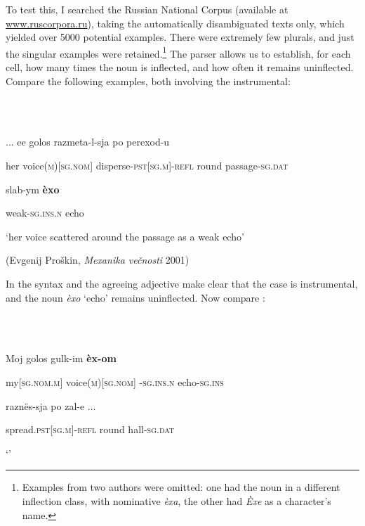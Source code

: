 \documentclass[output=paper]{langscibook}
\begin{document}
To test this, I searched the Russian National Corpus (available at \href{http://www.ruscorpora.ru}{{www.ruscorpora.ru}}), taking the automatically disambiguated texts only, which yielded over 5000 potential examples. There were extremely few plurals, and just the singular examples were retained.\footnote{\textrm{Examples from two authors were omitted: one had the noun in a different inflection class, with nominative} \textrm{\textit{èxa}}\textrm{, the other had} \textrm{\textit{Èxe}} \textrm{as a character’s name.}} The parser allows us to establish, for each cell, how many times the noun is inflected, and how often it remains uninflected. Compare the following examples, both involving the instrumental:

\ea%
    \label{ex:key:7}
    \gll \\
         \\
    \glt
    \z %

          ... ee  golos  razmeta-l-sja  po  perexod-u

      her  voice(\textsc{m)[sg.nom}]  disperse-\textsc{pst[sg.m}]\textsc{{}-refl}  round  passage-\textsc{sg.dat}

  slab-ym  \textbf{èxo}

  weak-\textsc{sg.ins.n}  echo

  ‘her voice scattered around the passage as a weak echo’ 

    (Evgenij Proškin, \textit{Mexanika večnosti} 2001)

In  the syntax and the agreeing adjective make clear that the case is instrumental, and the noun \textit{èxo} ‘echo’ remains uninflected. Now compare :

\ea%
    \label{ex:key:8}
    \gll \\
         \\
    \glt
    \z %

          Moj  golos  gulk-im  \textbf{èx-om}  

  my[\textsc{sg.nom.m}]  voice(\textsc{m)[sg.nom}]  -\textsc{sg.ins.n}  echo-\textsc{sg.ins}

  raznës-sja  po  zal-e ...

  spread.\textsc{pst[sg.m}]\textsc{{}-refl}  round  hall-\textsc{sg.dat}

  ‘’ 
\end{document}
